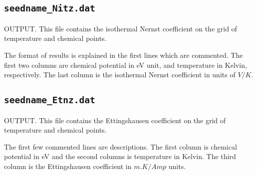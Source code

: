 \subsection{{\tt seedname\_Nitz.dat}}
OUTPUT. This file contains the isothermal Nernst coefficient on the grid of temperature and chemical points. 

The format of results is explained in the first lines which are commented. The first two columns are chemical potential in eV unit, and temperature in Kelvin, respectively. The last column is the isothermal Nernst coefficient in units of $V/K$. 

\subsection{{\tt seedname\_Etnz.dat}}
OUTPUT. This file contains the Ettingshausen coefficient on the grid of temperature and chemical points. 

The first few commented lines are descriptions. The first column is chemical potential in eV and the second columns is temperature in Kelvin. The third column is the Ettingshausen coefficient in $m.K/Amp$ units. 
